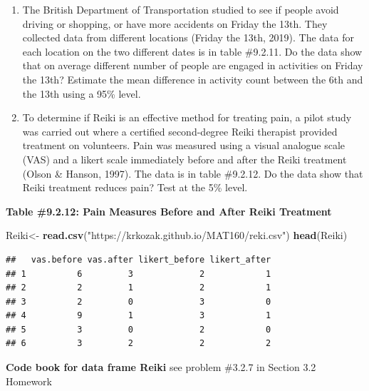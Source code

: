 \documentclass[
]{book}
\newenvironment{Shaded}{\begin{snugshade}}{\end{snugshade}}
\newcommand{\KeywordTok}[1]{\textcolor[rgb]{0.13,0.29,0.53}{\textbf{#1}}}
\newcommand{\NormalTok}[1]{#1}
\newcommand{\StringTok}[1]{\textcolor[rgb]{0.31,0.60,0.02}{#1}}
\begin{document}
\begin{enumerate}
\def\labelenumi{\arabic{enumi}.}
\setcounter{enumi}{5}
\item
  The British Department of Transportation studied to see if people avoid driving or shopping, or have more accidents on Friday the 13th. They collected data from different locations (Friday the 13th, 2019). The data for each location on the two different dates is in table \#9.2.11. Do the data show that on average different number of people are engaged in activities on Friday the 13th? Estimate the mean difference in activity count between the 6th and the 13th using a 95\% level.
\item
  To determine if Reiki is an effective method for treating pain, a pilot study was carried out where a certified second-degree Reiki therapist provided treatment on volunteers. Pain was measured using a visual analogue scale (VAS) and a likert scale immediately before and after the Reiki treatment (Olson \& Hanson, 1997). The data is in table \#9.2.12. Do the data show that Reiki treatment reduces pain? Test at the 5\% level.
\end{enumerate}

\textbf{Table \#9.2.12: Pain Measures Before and After Reiki Treatment}

\begin{Shaded}
\begin{Highlighting}[]
\NormalTok{Reiki<-}\StringTok{ }\KeywordTok{read.csv}\NormalTok{(}\StringTok{"https://krkozak.github.io/MAT160/reki.csv"}\NormalTok{)}
\KeywordTok{head}\NormalTok{(Reiki)}
\end{Highlighting}
\end{Shaded}

\begin{verbatim}
##   vas.before vas.after likert_before likert_after
## 1          6         3             2            1
## 2          2         1             2            1
## 3          2         0             3            0
## 4          9         1             3            1
## 5          3         0             2            0
## 6          3         2             2            2
\end{verbatim}

\textbf{Code book for data frame Reiki} see problem \#3.2.7 in Section 3.2 Homework
\end{document}
